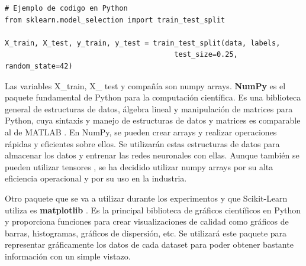 \lstset{language=Python}
\begin{lstlisting}
# Ejemplo de codigo en Python
from sklearn.model_selection import train_test_split

X_train, X_test, y_train, y_test = train_test_split(data, labels,
                                        test_size=0.25, random_state=42)
\end{lstlisting}


Las variables X\_train, X\_ test y compañía son numpy arrays. \textbf{NumPy} \citep{numpy} es el paquete fundamental de Python para la computación científica. Es una biblioteca general de estructuras de datos, álgebra lineal y manipulación de matrices para Python, cuya sintaxis y manejo de estructuras de datos y matrices es comparable al de MATLAB \citep{bloice2016tutorial}. En NumPy, se pueden crear arrays y realizar operaciones rápidas y eficientes sobre ellos. Se utilizarán estas estructuras de datos para almacenar los datos y entrenar las redes neuronales con ellas. Aunque también se pueden utilizar tensores \citep{modeltraining}, se ha decidido utilizar numpy arrays por su alta eficiencia operacional y por su uso en la industria.


Otro paquete que se va a utilizar durante los experimentos y que Scikit-Learn utiliza es \textbf{matplotlib} \citep{matplotlib}. Es la principal biblioteca de gráficos científicos en Python y proporciona funciones para crear visualizaciones de calidad como gráficos de barras, histogramas, gráficos de dispersión, etc. Se utilizará este paquete para representar gráficamente los datos de cada dataset para poder obtener bastante información con un simple vistazo. 










